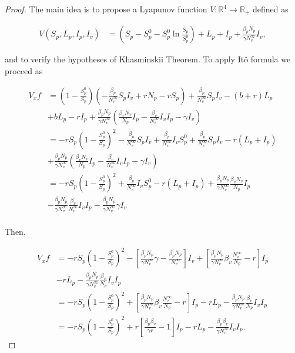 \begin{proof}
	The main idea is to propose a Lyapunov function $V :\mathbb{R}^4\rightarrow \mathbb{R}_+$ defined as
	
	\begin{align*}
		V(S_p,L_p,I_p,I_v) &= 
			\left(S_p-S_p^0-S_p^0\ln\frac{S_p}{S_p^0}\right)+L_p+I_p+\frac{\beta_p N_p}{\gamma N^\infty_v}I_v,
	\end{align*}
	
	and to verify the hypotheses of Khasminskii Theorem. To apply It\^{o} formula we proceed as
	
	\begin{align*}
		V_x f &=
				\left(1-\frac{S_p^0}{S_p}\right)\left(-\frac{\beta_p}{N^\infty_v}S_pI_v+ rN_p-r S_p\right)+\frac{\beta_p}{N^\infty_v}S_pI_v-(b+r)L_p\\
			  &+
				bL_p-rI_p+\frac{\beta_p N_p}{\gamma N^\infty_v}\left(\frac{\beta_v N_v}{N_p}I_p-\frac{\beta_v}{N_v^\infty}I_vI_p-\gamma I_v\right)\\
			  &=
			  	-rS_p\left(1-\frac{S_p^0}{S_p}\right)^2-\frac{\beta_p}{N_v^\infty}S_pI_v+\frac{\beta_p}{N_v^\infty}I_vS_p^0+\frac{\beta_p}{N_v^\infty}S_pI_v-r(L_p+I_p)\\
			  &+
			  	\frac{\beta_p N_p}{\gamma N^\infty_v}\left(\frac{\beta_v N_v}{N_p}I_p-\frac{\beta_v}{N_v^\infty}I_vI_p-\gamma I_v\right)\\
			  &=
			  	-rS_p\left(1-\frac{S_p^0}{S_p}\right)^2+\frac{\beta_p}{N_v^\infty}I_vS_p^0-r(L_p+I_p)+\frac{\beta_p N_p}{\gamma N^\infty_v}\frac{\beta_v N_v}{N_p}I_p\\
			  &-	
			  	\frac{\beta_p N_p}{\gamma N^\infty_v}\frac{\beta_v}{N_v^\infty}I_vI_p-\frac{\beta_p N_p}{\gamma N^\infty_v}\gamma I_v\\
	\end{align*}
	
	Then,
	
	\begin{align*}
		V_x f &=
				-rS_p\left(1-\frac{S_p^0}{S_p}\right)^2-\left[\frac{\beta_p N_p}{\gamma N^\infty_v}\gamma-\frac{\beta_p N_p}{N_v^\infty}\right]I_v+\left[\frac{\beta_p N_p}{\gamma N^\infty_v}\beta_v\frac{N_v^\infty}{N_p}-r\right]I_p\\
		 	  &-
				rL_p-\frac{\beta_p N_p}{\gamma N^\infty_v}\frac{\beta_v}{N_p}I_vI_p\\
			  &=
			  	-rS_p\left(1-\frac{S_p^0}{S_p}\right)^2 + \left[\frac{\beta_p N_p}{\gamma N^\infty_v}\beta_v\frac{N_v^\infty}{N_p}-r\right]I_p-rL_p-\frac{\beta_p N_p}{\gamma N^\infty_v}\frac{\beta_v}{N_p}I_vI_p\\
			  &=
			  	-rS_p\left(1-\frac{S_p^0}{S_p}\right)^2 + r\left[\frac{\beta_p\beta_v}{\gamma r}-1\right]I_p-rL_p-\frac{\beta_p\beta_v}{\gamma N^\infty_v}I_vI_p.
	\end{align*}
	

\end{proof}

